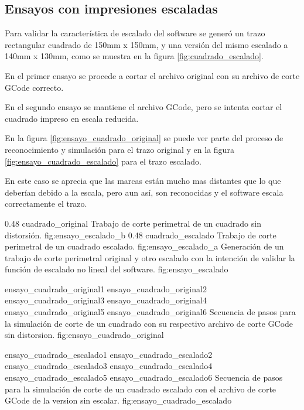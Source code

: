 \subsection{Ensayos con impresiones escaladas}

Para validar la característica de escalado del software se generó un trazo rectangular cuadrado de 150mm x 150mm, y una versión del mismo escalado a 140mm x 130mm, como se muestra en la figura \ref{fig:cuadrado_escalado}.\par
   En el primer ensayo se procede a cortar el archivo original con su archivo de corte GCode correcto. \par
   En el segundo ensayo se mantiene el archivo GCode, pero se intenta cortar el cuadrado impreso en escala reducida.\par
   En la figura \ref{fig:ensayo_cuadrado_original} se puede ver parte del proceso de reconocimiento y simulación para el trazo original y en la figura \ref{fig:ensayo_cuadrado_escalado} para el trazo escalado.\par
   En este caso se aprecia que las marcas están mucho mas distantes que lo que deberían debido a la escala, pero aun así, son reconocidas y el software escala correctamente el trazo.
   
   \subfigab
   {0.48} {cuadrado_original} {Trabajo de corte perimetral de un cuadrado sin distorsión.} {fig:ensayo_escalado_b}
   {0.48} {cuadrado_escalado} {Trabajo de corte perimetral de un cuadrado escalado.} {fig:ensayo_escalado_a}
   {Generación de un trabajo de corte perimetral original y otro escalado con la intención de validar la función de escalado no lineal del software. }
   {fig:ensayo_escalado}

   \subfigthreethree
      {ensayo_cuadrado_original1}
      {ensayo_cuadrado_original2}
      {ensayo_cuadrado_original3}
      {ensayo_cuadrado_original4}
      {ensayo_cuadrado_original5}
      {ensayo_cuadrado_original6}
      {Secuencia de pasos para la simulación de corte de un cuadrado con su respectivo archivo de corte GCode sin distorsion.}
      {fig:ensayo_cuadrado_original}


   \subfigthreethree
      {ensayo_cuadrado_escalado1}
      {ensayo_cuadrado_escalado2}
      {ensayo_cuadrado_escalado3}
      {ensayo_cuadrado_escalado4}
      {ensayo_cuadrado_escalado5}
      {ensayo_cuadrado_escalado6}
      {Secuencia de pasos para la simulación de corte de un cuadrado escalado con el archivo de corte GCode de la version sin escalar.}
      {fig:ensayo_cuadrado_escalado}


